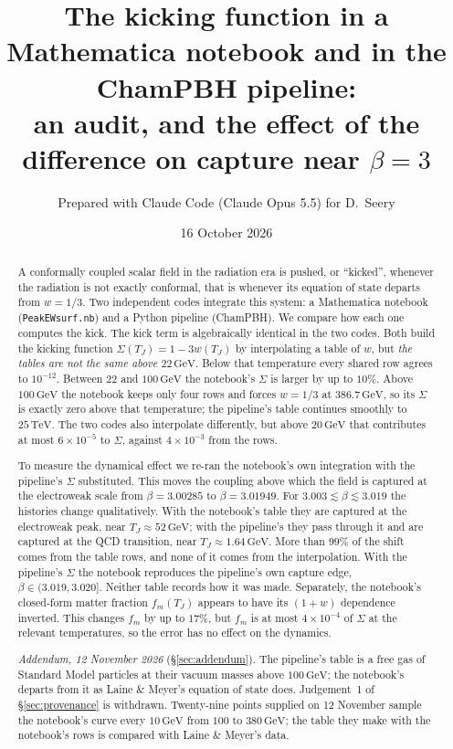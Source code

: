 \documentclass[11pt,a4paper]{article}
\title{The kicking function in a Mathematica notebook and in the ChamPBH pipeline:\\
  an audit, and the effect of the difference on capture near $\beta = 3$}
\author{Prepared with Claude Code (Claude Opus 5.5) for D.~Seery}
\date{16 October 2026}
\newcommand{\TJ}{T_{J}}
\newcommand{\GeV}{\,\mathrm{GeV}}
\newcommand{\code}[1]{\texttt{#1}}
\begin{document}
\maketitle

\begin{abstract}
\noindent
A conformally coupled scalar field in the radiation era is pushed, or ``kicked'', whenever
the radiation is not exactly conformal, that is whenever its equation of state departs from
$w = 1/3$. Two independent codes integrate this system: a Mathematica notebook
(\code{PeakEWsurf.nb}) and a Python pipeline (ChamPBH). We compare how each one computes
the kick. The kick term is algebraically identical in the two codes. Both build the kicking
function $\Sigma(\TJ) = 1 - 3w(\TJ)$ by interpolating a table of $w$, but \emph{the tables are
not the same above $22\GeV$}. Below that temperature every shared row agrees to $10^{-12}$.
Between $22$ and $100\GeV$ the notebook's $\Sigma$ is larger by up to $10\%$. Above
$100\GeV$ the notebook keeps only four rows and forces $w = 1/3$ at $386.7\GeV$, so its
$\Sigma$ is exactly zero above that temperature; the pipeline's table continues smoothly to
$25\,\mathrm{TeV}$. The two codes also interpolate differently, but above $20\GeV$ that contributes at most
$6\times10^{-5}$ to $\Sigma$, against $4\times10^{-3}$ from the rows.

To measure the dynamical effect we re-ran the notebook's own integration with the pipeline's
$\Sigma$ substituted. This moves the coupling above which the field is captured at the
electroweak scale from $\beta = 3.00285$ to $\beta = 3.01949$. For $3.003 \lesssim \beta
\lesssim 3.019$ the histories change qualitatively. With the notebook's table they are
captured at the electroweak peak, near $\TJ \approx 52\GeV$; with the pipeline's they pass
through it and are captured at the QCD transition, near $\TJ \approx 1.64\GeV$. More than
$99\%$ of the shift comes from the table rows, and none of it comes from the interpolation.
With the pipeline's $\Sigma$ the notebook reproduces the pipeline's own capture edge,
$\beta \in (3.019, 3.020]$. Neither table records how it was made. Separately, the notebook's
closed-form matter fraction $f_m(\TJ)$ appears to have its $(1+w)$ dependence inverted.
This changes $f_m$ by up to $17\%$, but $f_m$ is at most $4\times10^{-4}$ of $\Sigma$ at the
relevant temperatures, so the error has no effect on the dynamics.

\medskip\noindent
\emph{Addendum, 12 November 2026} (\S\ref{sec:addendum}). The pipeline's table is a free gas of
Standard Model particles at their vacuum masses above $100\GeV$; the notebook's departs from it as
Laine \& Meyer's equation of state does. Judgement~1 of \S\ref{sec:provenance} is withdrawn.
Twenty-nine points supplied on 12 November sample the notebook's curve every $10\GeV$ from $100$ to
$380\GeV$; the table they make with the notebook's rows is compared with Laine \& Meyer's data.
\end{abstract}
\end{document}
